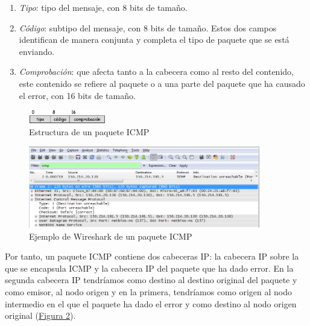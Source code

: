 \documentclass[10pt,a4paper,spanish]{report}
\begin{document}
\begin{enumerate}[\color{tema4}{$\heartsuit$}]
  \item \textit{\textcolor{tema4}{Tipo}}: tipo del mensaje, con 8 bits de tamaño.
  \item \textit{\textcolor{tema4}{Código}}: subtipo del mensaje, con 8 bits de tamaño. Estos dos campos identifican de manera conjunta y completa el tipo de paquete que se está enviando.
  \item \textit{\textcolor{tema4}{Comprobación}}:  que afecta tanto a la cabecera como al resto del contenido, este contenido se refiere al paquete o a una parte del paquete que ha causado el error, con 16 bits de tamaño.
\end{enumerate}

\begin{figure}[!h]
  \centering
  \includegraphics[width=0.3\textwidth]{paqueteICMP}
  \caption{Estructura de un paquete ICMP}
  \label{paqueteICMP}
\end{figure}

\begin{figure}[!h]
  \centering
  \includegraphics[width=0.9\textwidth]{ejICMP}
  \caption{Ejemplo de Wireshark de un paquete ICMP}
  \label{ejICMP}
\end{figure}

Por tanto, un paquete ICMP contiene dos cabeceras IP: la cabecera IP sobre la que se encapsula ICMP y la cabecera IP del paquete que ha dado error. En la segunda cabecera IP tendríamos como destino al destino original del paquete y como emisor, al nodo origen y en la primera, tendríamos como origen al nodo intermedio en el que el paquete ha dado el error y como destino al nodo origen original (\hyperref[ejICMP]{Figura \ref*{ejICMP}}).
\end{document}

